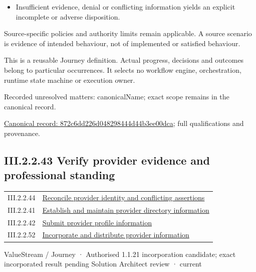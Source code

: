 \begin{itemize}


\item Insufficient evidence, denial or conflicting information yields an explicit incomplete or adverse disposition.

\end{itemize}


Source-specific policies and authority limits remain applicable. A source scenario is evidence of intended behaviour, not of implemented or satisfied behaviour.



This is a reusable Journey definition. Actual progress, decisions and outcomes belong to particular occurrences. It selects no workflow engine, orchestration, runtime state machine or execution owner.


{\small Recorded unresolved matters: canonicalName; exact scope remains in the canonical record.}\par
{\footnotesize \href{../../../../../../../continuum/strategy/value-stream/872c6dd226d048298444d44b3ee00dca.md}{Canonical record: 872c6dd226d048298444d44b3ee00dca}; full qualifications and provenance.}\par
\subsection*{III.2.2.43 Verify provider evidence and professional standing}
\label{navigation:III.2.2.43}

\begin{longtable}{p{.22\linewidth}p{.73\linewidth}}
III.2.2.44 & \hyperref[element:3afbc885a4a74b24a1240acb8725bad2]{Reconcile provider identity and conflicting assertions} \\
III.2.2.41 & \hyperref[element:679b0055ee5d42d4a838e35edd3de01f]{Establish and maintain provider directory information} \\
III.2.2.42 & \hyperref[element:872c6dd226d048298444d44b3ee00dca]{Submit provider profile information} \\
III.2.2.52 & \hyperref[element:9eb9f3210d5e4b46ac21463f54e62ab9]{Incorporate and distribute provider information} \\
\end{longtable}
\label{element:733f2f6c9a5e49ceb0107d30bc736945}
{\small ValueStream / Journey · Authorised 1.1.21 incorporation candidate; exact incorporated result pending Solution Architect review · current}\par

